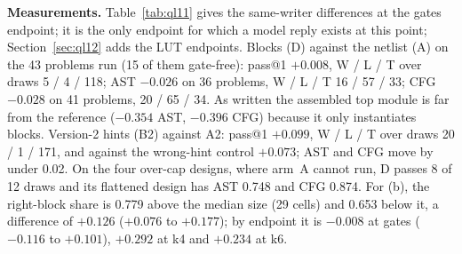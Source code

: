 \documentclass[conference]{IEEEtran}
\newcommand{\hev}[1]{\par\smallskip\noindent\textbf{#1}}
\begin{document}
\hev{Measurements.} Table~\ref{tab:ql11} gives the same-writer differences at the gates endpoint; it is the only endpoint for which a model reply exists at this point; Section~\ref{sec:ql12} adds the LUT endpoints. Blocks (D) against the netlist (A) on the 43 problems run (15 of them gate-free): pass@1 $+0.008$, W / L / T over draws 5 / 4 / 118; AST $-0.026$ on 36 problems, W / L / T 16 / 57 / 33; CFG $-0.028$ on 41 problems, 20 / 65 / 34. As written the assembled top module is far from the reference ($-0.354$ AST, $-0.396$ CFG) because it only instantiates blocks. Version-2 hints (B2) against A2: pass@1 $+0.099$, W / L / T over draws 20 / 1 / 171, and against the wrong-hint control $+0.073$; AST and CFG move by under 0.02. On the four over-cap designs, where arm~A cannot run, D passes 8 of 12 draws and its flattened design has AST 0.748 and CFG 0.874. For (b), the right-block share is 0.779 above the median size (29 cells) and 0.653 below it, a difference of $+0.126$ ($+0.076$ to $+0.177$); by endpoint it is $-0.008$ at gates ($-0.116$ to $+0.101$), $+0.292$ at k4 and $+0.234$ at k6.

\begin{table}[t]
\caption{Differences at the gates endpoint, tested arm minus reference arm, same writer, with the 95 percent bootstrap interval over problems. N is the number of problems with a pass value; AST and CFG use the problems where both arms have a parsed design. The reference is A (A2 for B2, W for the fourth row).}
\label{tab:ql11}
\centering
\footnotesize
{}
\end{table}
\end{document}
